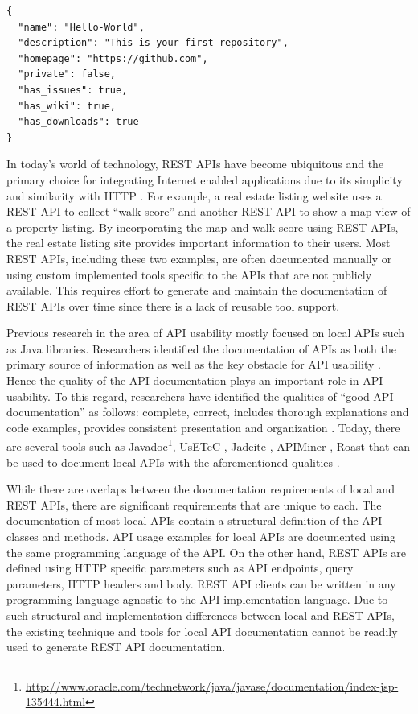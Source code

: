 \begin{verbatim}
{
  "name": "Hello-World",
  "description": "This is your first repository",
  "homepage": "https://github.com",
  "private": false,
  "has_issues": true,
  "has_wiki": true,
  "has_downloads": true
}
\end{verbatim}

In today's world of technology, REST APIs have become ubiquitous and the primary choice for integrating Internet enabled applications due to its simplicity and similarity with HTTP \cite{mangler2010origin}. For example, a real estate listing website uses a REST API to collect ``walk score'' and another REST API to show a map view of a property listing. By incorporating the map and walk score using REST APIs, the real estate listing site provides important information to their users. Most REST APIs, including these two examples, are often documented manually or using custom implemented tools specific to the APIs that are not publicly available. This requires effort to generate and maintain the documentation of REST APIs over time since there is a lack of reusable tool support.

Previous research in the area of API usability mostly focused on local APIs such as Java libraries. Researchers identified the documentation of APIs as both the primary source of information as well as the key obstacle for API usability \cite{Robillard_what_makes}. Hence the quality of the API documentation plays an important role in API usability. To this regard, researchers have identified the qualities of ``good API documentation'' as follows: complete, correct, includes thorough explanations and code examples, provides consistent presentation and organization \cite{Robillard_what_makes,Myers_study}. Today, there are several tools such as Javadoc\footnote{\url{http://www.oracle.com/technetwork/java/javase/documentation/index-jsp-135444.html}}, UsETeC \cite{zhu2014mining}, Jadeite \cite{Jadeite}, APIMiner \cite{montandon2013documenting}, Roast \cite{Hoffman_api_documentation} that can be used to document local APIs with the aforementioned qualities .

While there are overlaps between the documentation requirements of local and REST APIs, there are significant requirements that are unique to each. The documentation of most local APIs contain a structural definition of the API classes and methods. API usage examples for local APIs are documented using the same programming language of the API. On the other hand, REST APIs are defined using HTTP specific parameters such as API endpoints, query parameters, HTTP headers and body. REST API clients can be written in any programming language agnostic to the API implementation language. Due to such structural and implementation differences between local and REST APIs, the existing technique and tools for local API documentation cannot be readily used to generate REST API documentation.

